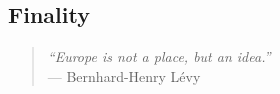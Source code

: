 \documentclass[11pt,a4paper,oneside,openright]{article}
\begin{document}


\subsection[Finality]{Finality} %

\begin{quote}
	\emph{``Europe is not a place, but an idea.''} \\ %
	--- Bernhard-Henry L\'{e}vy
\end{quote}
\end{document}
